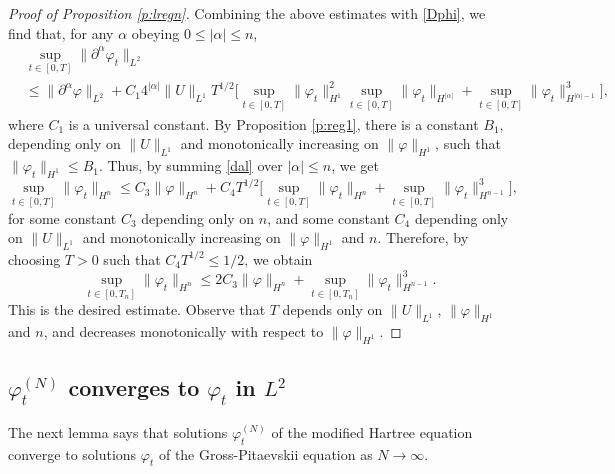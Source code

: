 \documentclass[11pt,a4paper,draft,DIV11]{scrartcl}	%
\newcommand{\ph}{\varphi_t^{(N)}}	%
\begin{document}
\begin{proof}[Proof of Proposition \ref{p:lregn}]
  
  Combining the above estimates with \eqref{Dphi}, we find that, for any
  $\alpha$ obeying $0 \le |\alpha| \le n$,
  \begin{equation} \label{dal}
    \begin{split}
      & \sup_{t \in [0,T]} \| \partial^\alpha \varphi_t \|_{L^2} \\
      & \le \| \partial^\alpha \varphi \|_{L^2} + C_1 4^{|\alpha|} \| U
      \|_{L^1} T^{1/2} \Big[ \sup_{t \in [0,T]} \| \varphi_t \|_{H^1}^2
      \sup_{t \in [0,T]} \| \varphi_t \|_{H^{|\alpha|}} + \sup_{t \in [0,T]}
      \| \varphi_t \|_{H^{|\alpha|-1}}^3 \Big],
    \end{split}
  \end{equation}
  where $C_1$ is a universal constant. By Proposition \ref{p:reg1}, there is a
  constant $B_1$, depending only on $\| U \|_{L^1}$ and monotonically
  increasing on $\| \varphi \|_{H^1}$, such that $\| \varphi_t \|_{H^1} \le
  B_1$. Thus, by summing \eqref{dal} over $|\alpha| \le n$, we get
  \[
    \sup_{t \in [0,T]} \| \varphi_t \|_{H^n} \le C_3 \| \varphi \|_{H^n} +
    C_4 T^{1/2} \Big[ \sup_{t \in [0,T]} \| \varphi_t \|_{H^n} + \sup_{t \in
    [0,T]} \| \varphi_t \|_{H^{n-1}}^3 \Big],
  \]
  for some constant $C_3$ depending only on $n$, and some constant $C_4$
  depending only on $\| U \|_{L^1}$ and monotonically increasing on $\|
  \varphi \|_{H^1}$ and $n$. Therefore, by choosing $T > 0$ such that $C_4
  T^{1/2} \le 1/2$, we obtain
  \[
    \sup_{t \in [0,T_n]} \| \varphi_t \|_{H^n} \le 2 C_3 \| \varphi \|_{H^n}
    + \sup_{t \in [0,T_n]} \| \varphi_t \|_{H^{n-1}}^3.
  \]
  This is the desired estimate. Observe that $T$ depends only on $\| U
  \|_{L^1}$, $\| \varphi \|_{H^1}$ and $n$, and decreases monotonically with
  respect to $\| \varphi \|_{H^1}$.
\end{proof}


\subsection{$\ph$ converges to $\varphi_t$ in $L^2$}


The next lemma says that solutions $\varphi_t^{(N)}$ of the modified Hartree
equation converge to solutions $\varphi_t$ of the Gross-Pitaevskii equation
as $N \to \infty$.
\end{document}
